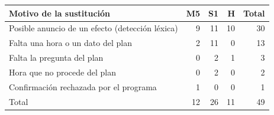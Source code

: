 \begin{tabular}{lrrrr}\toprule
Motivo de la sustitución & M5 & S1 & H & Total \\ \midrule
Posible anuncio de un efecto (detección léxica) & 9 & 11 & 10 & 30 \\
Falta una hora o un dato del plan & 2 & 11 & 0 & 13 \\
Falta la pregunta del plan & 0 & 2 & 1 & 3 \\
Hora que no procede del plan & 0 & 2 & 0 & 2 \\
Confirmación rechazada por el programa & 1 & 0 & 0 & 1 \\
\midrule Total & 12 & 26 & 11 & 49 \\
\bottomrule\end{tabular}
